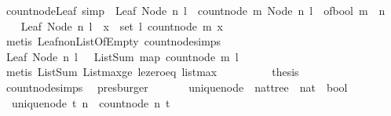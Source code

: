\begin{isabellebody}
\isamarkupfalse%
\ count{\isacharunderscore}node{\isacharunderscore}Leaf\ {\isacharbrackleft}simp{\isacharbrackright}\ {\isacharcolon}\ {\isachardoublequoteopen}Leaf\ {\isacharparenleft}Node\ n\ l{\isacharparenright}\ {\isasymlongrightarrow}\ count{\isacharunderscore}node\ m\ {\isacharparenleft}Node\ n\ l{\isacharparenright}\ {\isacharequal}\ of{\isacharunderscore}bool\ {\isacharparenleft}m\ {\isacharequal}\ n{\isacharparenright}{\isachardoublequoteclose}\isanewline
%
\isadelimproof
%
\endisadelimproof
%
\isatagproof
{}\isamarkupfalse%
\ {\isacharminus}\isanewline
\ \ \isamarkupfalse%
\ {\isachardoublequoteopen}Leaf\ {\isacharparenleft}Node\ n\ l{\isacharparenright}\ {\isasymlongrightarrow}\ {\isacharparenleft}{\isasymforall}x\ {\isasymin}\ set\ l{\isachardot}\ count{\isacharunderscore}node\ m\ x\ {\isacharequal}\ {}{\isacharparenright}{\isachardoublequoteclose}\isanewline
\ \ \ \ \isamarkupfalse%
\ {\isacharparenleft}metis\ Leaf{\isacharunderscore}non{\isacharunderscore}ListOfEmpty\ count{\isacharunderscore}node{\isachardot}simps{\isacharparenleft}{}{\isacharparenright}{\isacharparenright}\ \isanewline
\ \ \isamarkupfalse%
\ \isamarkupfalse%
\ {\isachardoublequoteopen}Leaf\ {\isacharparenleft}Node\ n\ l{\isacharparenright}\ {\isasymlongrightarrow}\ \ ListSum\ {\isacharparenleft}map\ {\isacharparenleft}count{\isacharunderscore}node\ m{\isacharparenright}\ l{\isacharparenright}\ {\isacharequal}\ {}{\isachardoublequoteclose}\isanewline
\ \ \ \ \isamarkupfalse%
\ {\isacharparenleft}metis\ ListSum{\isacharunderscore}{}\ Listmax{\isacharunderscore}ge\ le{\isacharunderscore}zero{\isacharunderscore}eq\ listmax{\isacharunderscore}{}{\isacharparenright}\ \ \ \ \isanewline
\ \ \isamarkupfalse%
\ \isamarkupfalse%
\ {\isacharquery}thesis\isanewline
\ \ \ \ \isamarkupfalse%
\ count{\isacharunderscore}node{\isachardot}simps{\isacharparenleft}{}{\isacharparenright}\ \isamarkupfalse%
\ presburger\ \isanewline
{}\isamarkupfalse%
%
\endisatagproof
{\isafoldproof}%
%
\isadelimproof
\isanewline
%
\endisadelimproof
\ \ \ \ \isanewline
{}\isamarkupfalse%
\ unique{\isacharunderscore}node\ {\isacharcolon}{\isacharcolon}\ {\isachardoublequoteopen}nattree\ {\isasymRightarrow}\ nat\ {\isasymRightarrow}\ bool{\isachardoublequoteclose}\ \isanewline
\ \ {\isachardoublequoteopen}unique{\isacharunderscore}node\ t\ n\ {\isacharequal}\ {\isacharparenleft}count{\isacharunderscore}node\ n\ t\ {\isacharequal}\ {}{\isacharparenright}{\isachardoublequoteclose}%

\end{isabellebody}
